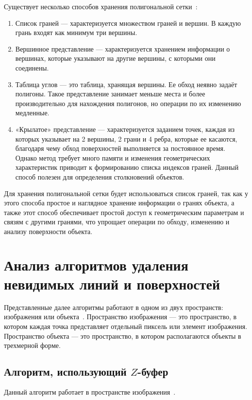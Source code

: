 Существует несколько способов хранения полигональной сетки~\cite{roders}:
\begin{enumerate}[label=\arabic*)]
	\item Список граней --- характеризуется множеством граней и вершин. В каждую грань входят как минимум три вершины. 
	\item Вершинное представление --- характеризуется хранением информации о вершинах, которые указывают на другие вершины, с которыми они соединены.
	\item Таблица углов --- это таблица, хранящая вершины. Ее обход неявно задаёт полигоны. Такое представление занимает меньше места и более производительно для нахождения полигонов, но операции по их изменению медленные.
    \item «Крылатое» представление --- характеризуется заданием точек, каждая из которых указывает на 2 вершины, 2 грани и 4 ребра, которые ее касаются, благодаря чему обход поверхностей выполняется за постоянное время. Однако метод требует много памяти и изменения геометрических характеристик приводит к формированию списка индексов граней. Данный способ полезен для определения столкновений объектов.
\end{enumerate}

Для хранения полигональной сетки будет использоваться список граней, так как у этого способа простое и наглядное хранение информации о гранях объекта, а также этот способ обеспечивает простой доступ к геометрическим параметрам и связям с другими гранями, что упрощает операции по обходу, изменению и анализу поверхности объекта.


\section{Анализ алгоритмов удаления невидимых линий и поверхностей}

Представленные далее алгоритмы работают в одном из двух пространств: изображения или объекта~\cite{roders}. Пространство изображения --- это пространство, в котором каждая точка представляет отдельный пиксель или элемент изображения. Пространство объекта --- это пространство, в котором располагаются объекты в трехмерной форме. 

\subsection{Алгоритм, использующий $Z$-буфер}

Данный алгоритм работает в пространстве изображения~\cite{roders}.

